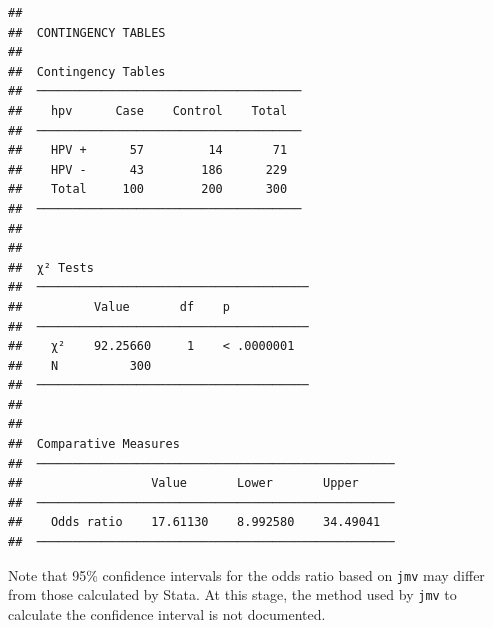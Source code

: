 \documentclass[
]{memoir}
\begin{document}
\begin{verbatim}
## 
##  CONTINGENCY TABLES
## 
##  Contingency Tables                    
##  ───────────────────────────────────── 
##    hpv      Case    Control    Total   
##  ───────────────────────────────────── 
##    HPV +      57         14       71   
##    HPV -      43        186      229   
##    Total     100        200      300   
##  ───────────────────────────────────── 
## 
## 
##  χ² Tests                               
##  ────────────────────────────────────── 
##          Value       df    p            
##  ────────────────────────────────────── 
##    χ²    92.25660     1    < .0000001   
##    N          300                       
##  ────────────────────────────────────── 
## 
## 
##  Comparative Measures                               
##  ────────────────────────────────────────────────── 
##                  Value       Lower       Upper      
##  ────────────────────────────────────────────────── 
##    Odds ratio    17.61130    8.992580    34.49041   
##  ──────────────────────────────────────────────────
\end{verbatim}

Note that 95\% confidence intervals for the odds ratio based on \texttt{jmv} may differ from those calculated by Stata. At this stage, the method used by \texttt{jmv} to calculate the confidence interval is not documented.

  
\end{document}
